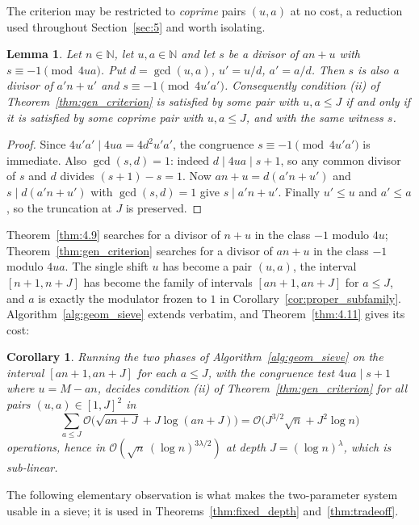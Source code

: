 \documentclass[11pt, a4paper]{article}
\theoremstyle{plain}
\newtheorem{lemma}[theorem]{Lemma}
\newtheorem{corollary}[theorem]{Corollary}
\theoremstyle{definition}
\newcommand{\N}{\mathbb{N}}
\begin{document}
The criterion may be restricted to \emph{coprime} pairs $(u,a)$ at no cost, a reduction used throughout Section~\ref{sec:5} and worth isolating.

\begin{lemma}\label{lem:coprime_reduction}
Let $n\in\N$, let $u,a\in\N$ and let $s$ be a divisor of $an+u$ with $s\equiv-1\pmod{4ua}$. Put $d=\gcd(u,a)$, $u'=u/d$, $a'=a/d$. Then $s$ is also a divisor of $a'n+u'$ and $s\equiv-1\pmod{4u'a'}$. Consequently condition (ii) of Theorem~\ref{thm:gen_criterion} is satisfied by some pair with $u,a\le J$ if and only if it is satisfied by some \emph{coprime} pair with $u,a\le J$, and with the same witness $s$.
\end{lemma}
\begin{proof}
Since $4u'a'\mid 4ua=4d^{2}u'a'$, the congruence $s\equiv-1\pmod{4u'a'}$ is immediate. Also $\gcd(s,d)=1$: indeed $d\mid 4ua\mid s+1$, so any common divisor of $s$ and $d$ divides $(s+1)-s=1$. Now $an+u=d(a'n+u')$ and $s\mid d(a'n+u')$ with $\gcd(s,d)=1$ give $s\mid a'n+u'$. Finally $u'\le u$ and $a'\le a$, so the truncation at $J$ is preserved.
\end{proof}

Theorem~\ref{thm:4.9} searches for a divisor of $n+u$ in the class $-1$ modulo $4u$; Theorem~\ref{thm:gen_criterion} searches for a divisor of $an+u$ in the class $-1$ modulo $4ua$. The single shift $u$ has become a pair $(u,a)$, the interval $[n+1,n+J]$ has become the family of intervals $[an+1,an+J]$ for $a\le J$, and $a$ is exactly the modulator frozen to $1$ in Corollary~\ref{cor:proper_subfamily}. Algorithm~\ref{alg:geom_sieve} extends verbatim, and Theorem~\ref{thm:4.11} gives its cost:

\begin{corollary}\label{cor:gen_reading}
Running the two phases of Algorithm~\ref{alg:geom_sieve} on the interval $[an+1,an+J]$ for each $a\le J$, with the congruence test $4ua\mid s+1$ where $u=M-an$, decides condition (ii) of Theorem~\ref{thm:gen_criterion} for all pairs $(u,a)\in[1,J]^{2}$ in
$$\sum_{a\le J}\mathcal{O}\big(\sqrt{an+J}+J\log(an+J)\big)=\mathcal{O}\big(J^{3/2}\sqrt n+J^{2}\log n\big)$$
operations, hence in $\mathcal{O}(\sqrt n\,(\log n)^{3\lambda/2})$ at depth $J=(\log n)^{\lambda}$, which is sub-linear.
\end{corollary}

The following elementary observation is what makes the two-parameter system usable in a sieve; it is used in Theorems~\ref{thm:fixed_depth} and~\ref{thm:tradeoff}.
\end{document}

